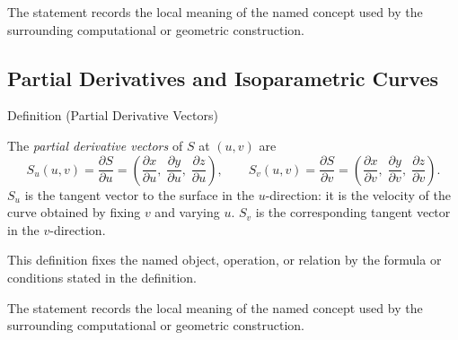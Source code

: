 \begin{remark*}[Interpretation]
The statement records the local meaning of the named concept used by the
surrounding computational or geometric construction.
\end{remark*}

\DefinitionalRoot

\subsection*{Partial Derivatives and Isoparametric Curves}

\begin{definitionbox}{Definition (Partial Derivative Vectors)}
\begin{definition}
\label{def:partial-derivative-vectors}
The \emph{partial derivative vectors} of $S$ at $(u,v)$ are
\[
  S_u(u,v) = \frac{\partial S}{\partial u}
  = \left(\frac{\partial x}{\partial u},\;
          \frac{\partial y}{\partial u},\;
          \frac{\partial z}{\partial u}\right),
  \qquad
  S_v(u,v) = \frac{\partial S}{\partial v}
  = \left(\frac{\partial x}{\partial v},\;
          \frac{\partial y}{\partial v},\;
          \frac{\partial z}{\partial v}\right).
\]
$S_u$ is the tangent vector to the surface in the $u$-direction:
it is the velocity of the curve obtained by fixing $v$ and varying $u$.
$S_v$ is the corresponding tangent vector in the $v$-direction.
\end{definition}
\end{definitionbox}
\begin{remark*}
This definition fixes the named object, operation, or relation by the formula
or conditions stated in the definition.
\end{remark*}

\begin{remark*}[Interpretation]
The statement records the local meaning of the named concept used by the
surrounding computational or geometric construction.
\end{remark*}

\DefinitionalRoot

